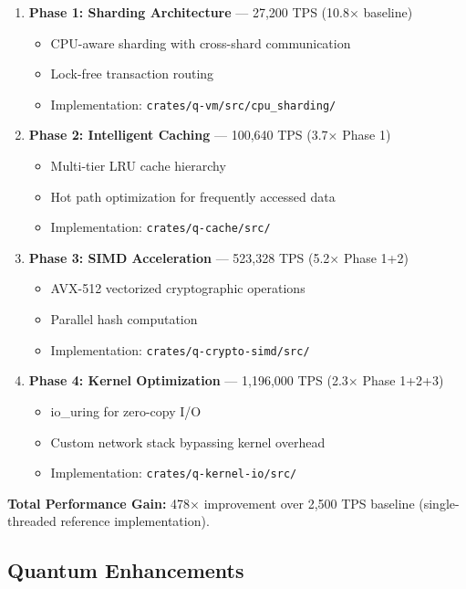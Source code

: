 \documentclass[11pt,a4paper]{scrartcl}
\begin{document}
\begin{enumerate}
\item \textbf{Phase 1: Sharding Architecture} — 27,200 TPS (10.8× baseline)
   \begin{itemize}
   \item CPU-aware sharding with cross-shard communication
   \item Lock-free transaction routing
   \item Implementation: \texttt{crates/q-vm/src/cpu\_sharding/}
   \end{itemize}

\item \textbf{Phase 2: Intelligent Caching} — 100,640 TPS (3.7× Phase 1)
   \begin{itemize}
   \item Multi-tier LRU cache hierarchy
   \item Hot path optimization for frequently accessed data
   \item Implementation: \texttt{crates/q-cache/src/}
   \end{itemize}

\item \textbf{Phase 3: SIMD Acceleration} — 523,328 TPS (5.2× Phase 1+2)
   \begin{itemize}
   \item AVX-512 vectorized cryptographic operations
   \item Parallel hash computation
   \item Implementation: \texttt{crates/q-crypto-simd/src/}
   \end{itemize}

\item \textbf{Phase 4: Kernel Optimization} — 1,196,000 TPS (2.3× Phase 1+2+3)
   \begin{itemize}
   \item io\_uring for zero-copy I/O
   \item Custom network stack bypassing kernel overhead
   \item Implementation: \texttt{crates/q-kernel-io/src/}
   \end{itemize}
\end{enumerate}

\textbf{Total Performance Gain:} 478× improvement over 2,500 TPS baseline (single-threaded reference implementation).

\subsection{Quantum Enhancements}
\end{document}
